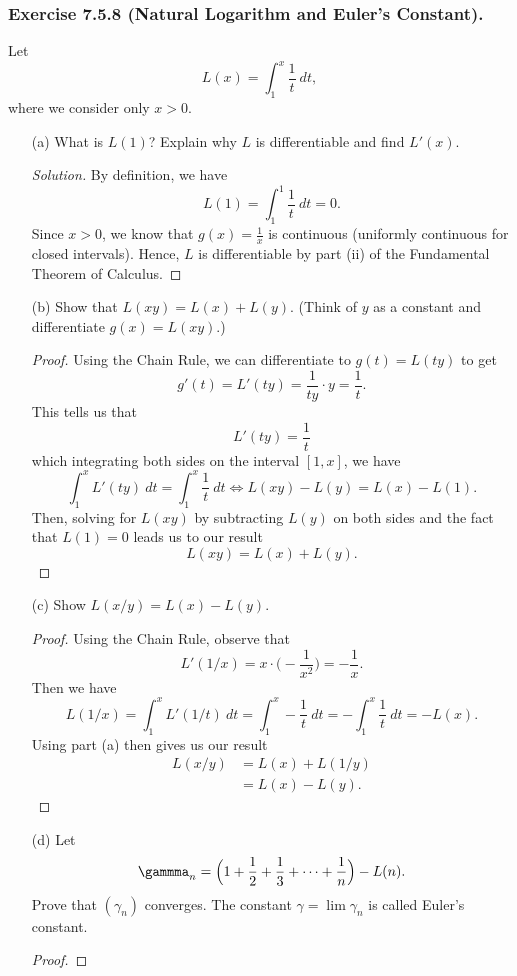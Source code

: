 \subsubsection{Exercise 7.5.8 (Natural Logarithm and Euler's Constant).} Let 
\[  L(x) = \int_{ 1 }^{ x } \frac{ 1 }{ t }  \  dt, \]
where we consider only \( x > 0  \).
\begin{enumerate}
    \item[(a)] What is \( L(1)  \)? Explain why \( L  \) is differentiable and find \( L'(x)  \).
		\begin{proof}[Solution]
		By definition, we have 
		\[  L(1) = \int_{ 1 }^{ 1 } \frac{ 1 }{ t } \   dt = 0. \] Since \( x > 0  \), we know that \( g(x) = \frac{ 1 }{ x  }  \) is continuous (uniformly continuous for closed intervals). Hence, \( L  \) is differentiable by part (ii) of the Fundamental Theorem of Calculus.
		\end{proof}
	\item[(b)] Show that \( L(xy) = L(x) + L(y)  \). (Think of \( y  \) as a constant and differentiate \( g(x) = L(xy)  \).) 
		\begin{proof}
		Using the Chain Rule, we can differentiate to \( g(t) = L(ty)  \) to get 
		\[  g'(t) = L'(ty) = \frac{ 1 }{ ty } \cdot y = \frac{ 1 }{ t }.  \]
		This tells us that 
		\[  L'(ty) = \frac{ 1 }{ t } \]
		which integrating both sides on the interval \( [1,x]  \), we have 
		\[  \int_{ 1 }^{ x } L'(ty)   \ dt = \int_{ 1 }^{ x } \frac{ 1 }{ t } \    dt \iff L(xy) - L(y) = L(x) - L(1)   .   \]
	Then, solving for \( L(xy)  \) by subtracting \( L(y)  \) on both sides and the fact that \( L(1) = 0  \) leads us to our result
	\[  L(xy) = L(x) + L(y). \]
		\end{proof}
	\item[(c)] Show \( L(x/y) = L(x) - L(y)  \).
		\begin{proof}
			Using the Chain Rule, observe that
		\[  L'(1/x) = x \cdot \Big( - \frac{ 1 }{ x^2 }  \Big) = -\frac{ 1 }{ x }.    \]
		Then we have 
		\[ L(1/x) = \int_{ 1 }^{ x } L'(1/t) \ dt = \int_{ 1 }^{ x } - \frac{ 1 }{ t } \    dt  = - \int_{ 1 }^{ x } \frac{ 1 }{ t } \    dt = - L(x). \]
		Using part (a) then gives us our result  
		\begin{align*}
		    L(x/y) &= L(x) + L(1/y) \\
				   &= L(x) - L(y).
		\end{align*}
		\end{proof}
	\item[(d)] Let 
		\[  \gammma_{n} = \Big( 1 + \frac{ 1 }{ 2 } + \frac{ 1 }{ 3 } + \dotsb + \frac{ 1 }{ n }  \Big) - L(n). \]
		Prove that \( (\gamma_{n}) \) converges. The constant \( \gamma = \lim \gamma_{n} \) is called Euler's constant. 
		\begin{proof}
		

\end{proof}
\end{enumerate}
